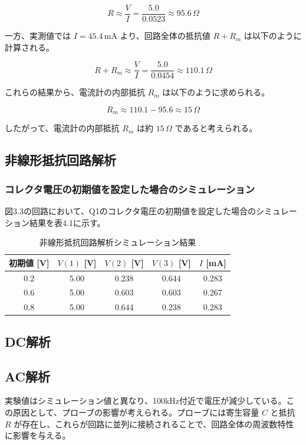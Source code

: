\documentclass{jlreq}
\numberwithin{equation}{section}
\begin{document}
\[
R \approx \frac{V}{I} = \frac{5.0}{0.0523} \approx 95.6 \, \Omega
\]

一方、実測値では \( I = 45.4 \, \mathrm{mA} \) より、回路全体の抵抗値 \( R + R_m \) は以下のように計算される。

\[
R + R_m \approx \frac{V}{I} = \frac{5.0}{0.0454} \approx 110.1 \, \Omega
\]

これらの結果から、電流計の内部抵抗 \( R_m \) は以下のように求められる。

\[
R_m \approx 110.1 - 95.6 \approx 15 \, \Omega
\]

したがって、電流計の内部抵抗 \( R_m \) は約 \( 15 \, \Omega \) であると考えられる。

\subsection{非線形抵抗回路解析}
\subsubsection{コレクタ電圧の初期値を設定した場合のシミュレーション}
図3.3の回路において、Q1のコレクタ電圧の初期値を設定した場合のシミュレーション結果を表4.1に示す。
\begin{table}[H]
  \centering
  \caption{非線形抵抗回路解析シミュレーション結果}
  \begin{tabular}{|c|c|c|c|c|}
    \hline
    初期値 [V] & \( V(1) \) [V] & \( V(2) \) [V] & \( V(3) \) [V] & \( I \) [mA] \\ \hline
    0.2 & 5.00 & 0.238 & 0.644 & 0.283 \\ \hline
    0.6 & 5.00 & 0.603 & 0.603 & 0.267 \\ \hline
    0.8 & 5.00 & 0.644 & 0.238 & 0.283 \\ \hline
  \end{tabular}
\end{table}

\subsection{DC解析}


\subsection{AC解析}
実験値はシミュレーション値と異なり、100kHz付近で電圧が減少している。この原因として、プローブの影響が考えられる。プローブには寄生容量 \( C \) と抵抗 \( R \) が存在し、これらが回路に並列に接続されることで、回路全体の周波数特性に影響を与える。
\end{document}
